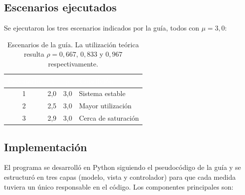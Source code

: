 \documentclass[11pt,a4paper]{article}
\renewcommand{\arraystretch}{1.08}
\begin{document}
\subsection{Escenarios ejecutados}

Se ejecutaron los tres escenarios indicados por la guía, todos con $\mu = 3{,}0$:

\begin{table}[h!]
\centering
\setlength{\arrayrulewidth}{0.75pt}
\renewcommand{\arraystretch}{1.25}
\begin{tabular}{|c|c|c|l|}
\hline
\rowcolor{headerblue}
\textbf{\textcolor{white}{Escenario}} & \textbf{\textcolor{white}{$\lambda$}} & \textbf{\textcolor{white}{$\mu$}} & \textbf{\textcolor{white}{Condición}} \\ \hline
1 & 2{,}0 & 3{,}0 & Sistema estable \\ \hline
\rowcolor{rowlight}
2 & 2{,}5 & 3{,}0 & Mayor utilización \\ \hline
3 & 2{,}9 & 3{,}0 & Cerca de saturación \\ \hline
\end{tabular}
\caption{Escenarios de la guía. La utilización teórica resulta $\rho = 0{,}667$,
$0{,}833$ y $0{,}967$ respectivamente.}
\end{table}

\subsection{Implementación}

El programa se desarrolló en Python siguiendo el pseudocódigo de la guía y se
estructuró en tres capas (modelo, vista y controlador) para que cada medida tuviera
un único responsable en el código. Los componentes principales son:
\end{document}
